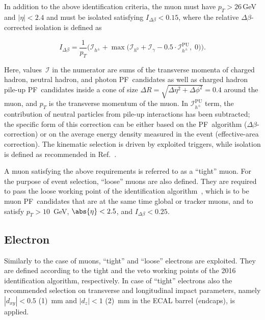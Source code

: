 In addition to the above identification criteria, the muon must have $p_{T} > 26$\,GeV and $|\eta| < 2.4$ and must be isolated satisfying $I_{\Delta\beta} < 0.15$, where the relative $\Delta\beta$-corrected isolation is defined as
\begin{linenomath}
\begin{equation}
 \label{Eq:IsolationDeltaBeta}
 I_{\Delta\beta} = \frac{1}{p_{T}} \Big(\mathcal I_{h^\pm} + \max\big(\mathcal I_{h^0} + \mathcal I_\gamma - 0.5\cdot \mathcal I_{h^\pm}^\text{PU},\; 0\big)\!\Big).
\end{equation}
\end{linenomath}
Here, values~$\mathcal I$ in the numerator are sums of the transverse momenta of charged hadron, neutral hadron, and photon PF~candidates as well as charged hadron pile-up PF~candidates inside a cone of size $\Delta R = \sqrt{\Delta\eta^2 + \Delta\phi^2} = 0.4$ around the muon, and $p_{T}$ is the transverse momentum of the muon. In $\mathcal I_{h^\pm}^\text{PU}$ term, the contribution of neutral particles from pile-up interactions has been subtracted; the specific form of this correction can be either based on the PF~algorithm ($\Delta\beta$-correction) or on the average energy density measured in the event (effective-area correction).
The kinematic selection is driven by exploited triggers, while isolation is defined as recommended in Ref.~\cite{Wiki:MuonID}.

A muon satisfying the above requirements is referred to as a ``tight'' muon.
For the purpose of event selection, ``loose'' muons are also defined.
They are required to pass the loose working point of the identification algorithm~\cite{Wiki:MuonID}, which is to be muon PF~candidates that are at the same time global or tracker muons, and to satisfy $p_{T} > 10$~GeV, $\abs{\eta} < 2.5$, and $I_{\Delta\beta} < 0.25$.

\subsection*{Electron}\label{subsec:electron}

Similarly to the case of muons, ``tight'' and ``loose'' electrons are exploited.
They are defined according to the tight and the veto working points of the 2016 identification algorithm, respectively.
In case of ``tight'' electrons also the recommended selection on transverse and longitudinal impact parameters, namely $|d_{xy}| < 0.5$ (1)~mm and $|d_z| < 1$ (2)~mm in the ECAL barrel (endcaps), is applied.

